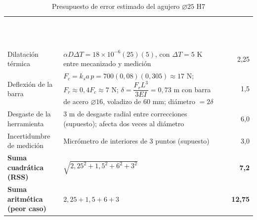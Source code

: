 \documentclass[12pt,a4paper]{article}
\newcommand{\encab}[1]{\textcolor{white}{\sffamily\bfseries #1}}
\begin{document}
\begin{table}[!htb]
	\centering
	\caption{Presupuesto de error estimado del agujero $\varnothing25$ H7}\label{tab:errores}
	\small
	\begin{tabularx}{\linewidth}{>{\raggedright\arraybackslash}p{4.0cm} X r}
		\rowcolor{darkblue}
		\encab{Fuente}                       & \encab{Estimación}                                                                                                                                                                                      & \encab{Error diam. (\textmu m)} \\
		Dilatación térmica                   & $\alpha D\Delta T=18\times10^{-6}(25)(5)$, con $\Delta T=5$ K entre mecanizado y medición                                                                                                               & 2,25                            \\
		Deflexión de la barra                & $F_c=k_sa\,p=700(0{,}08)(0{,}305)\approx17$ N; $F_r\approx0{,}4F_c\approx7$ N; $\delta=\dfrac{F_rL^3}{3EI}=0{,}73$ \textmu m con barra de acero $\varnothing16$, voladizo de 60 mm; diámetro $=2\delta$ & 1,5                             \\
		Desgaste de la herramienta           & 3 \textmu m de desgaste radial entre correcciones (supuesto); afecta dos veces al diámetro                                                                                                              & 6,0                             \\
		Incertidumbre de medición            & Micrómetro de interiores de 3 puntos (supuesto)                                                                                                                                                         & 3,0                             \\
		\midrule
		\textbf{Suma cuadrática (RSS)}       & $\sqrt{2{,}25^2+1{,}5^2+6^2+3^2}$                                                                                                                                                                       & \textbf{7,2}                    \\
		\textbf{Suma aritmética (peor caso)} & $2{,}25+1{,}5+6+3$                                                                                                                                                                                      & \textbf{12,75}                  \\
	\end{tabularx}
\end{table}
\end{document}
